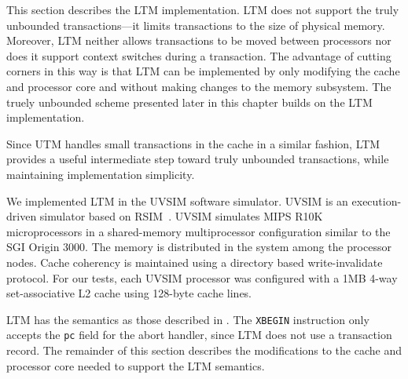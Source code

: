 This section describes the LTM implementation.  LTM does not
support the truly unbounded transactions---it limits transactions to
the size of physical memory.  Moreover,
LTM neither allows transactions to be moved between processors nor
does it support context switches during a transaction.  The advantage
of cutting corners in this way is that LTM can be implemented by only
modifying the cache and processor core and without making changes to
the memory subsystem.  The truely unbounded scheme presented later in
this chapter builds on the LTM implementation.

Since UTM handles small transactions in the
cache in a similar fashion, LTM provides a useful intermediate step
toward truly unbounded transactions, while maintaining implementation
simplicity.

We implemented LTM in the UVSIM software simulator. UVSIM is an
execution-driven simulator based on RSIM~\cite{PaiRaAd97}.  UVSIM
simulates MIPS R10K~\cite{MIPSR10K} microprocessors in a shared-memory
multiprocessor configuration similar to the SGI Origin 3000.  The
memory is distributed in the system among the processor nodes. Cache
coherency is maintained using a directory based write-invalidate
protocol. For our tests, each UVSIM processor was configured with a
1MB 4-way set-associative L2 cache using 128-byte cache lines.

LTM has the semantics as those described in .  The
\texttt{XBEGIN} instruction only accepts the \texttt{pc} field for the
abort handler, since LTM does not use a transaction record.  The
remainder of this section describes the modifications to the cache and
processor core needed to support the LTM semantics.

